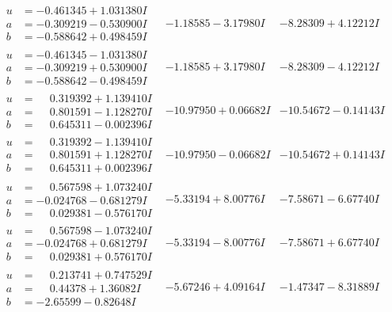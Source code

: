 \documentclass[1p]{elsarticle_modified}
\theoremstyle{definition}
\begin{document}
$$\begin{array}{c|c|c}
\begin{aligned}
u &= -0.461345 + 1.031380 I \\
a &= -0.309219 - 0.530900 I \\
b &= -0.588642 + 0.498459 I\end{aligned}
 & -1.18585 - 3.17980 I & -8.28309 + 4.12212 I \\ \hline\begin{aligned}
u &= -0.461345 - 1.031380 I \\
a &= -0.309219 + 0.530900 I \\
b &= -0.588642 - 0.498459 I\end{aligned}
 & -1.18585 + 3.17980 I & -8.28309 - 4.12212 I \\ \hline\begin{aligned}
u &= \phantom{-}0.319392 + 1.139410 I \\
a &= \phantom{-}0.801591 - 1.128270 I \\
b &= \phantom{-}0.645311 - 0.002396 I\end{aligned}
 & -10.97950 + 0.06682 I & -10.54672 - 0.14143 I \\ \hline\begin{aligned}
u &= \phantom{-}0.319392 - 1.139410 I \\
a &= \phantom{-}0.801591 + 1.128270 I \\
b &= \phantom{-}0.645311 + 0.002396 I\end{aligned}
 & -10.97950 - 0.06682 I & -10.54672 + 0.14143 I \\ \hline\begin{aligned}
u &= \phantom{-}0.567598 + 1.073240 I \\
a &= -0.024768 - 0.681279 I \\
b &= \phantom{-}0.029381 - 0.576170 I\end{aligned}
 & -5.33194 + 8.00776 I & -7.58671 - 6.67740 I \\ \hline\begin{aligned}
u &= \phantom{-}0.567598 - 1.073240 I \\
a &= -0.024768 + 0.681279 I \\
b &= \phantom{-}0.029381 + 0.576170 I\end{aligned}
 & -5.33194 - 8.00776 I & -7.58671 + 6.67740 I \\ \hline\begin{aligned}
u &= \phantom{-}0.213741 + 0.747529 I \\
a &= \phantom{-}0.44378 + 1.36082 I \\
b &= -2.65599 - 0.82648 I\end{aligned}
 & -5.67246 + 4.09164 I & -1.47347 - 8.31889 I \\ \hline\begin{aligned}

\end{aligned}
\end{array}$$
\end{document}
